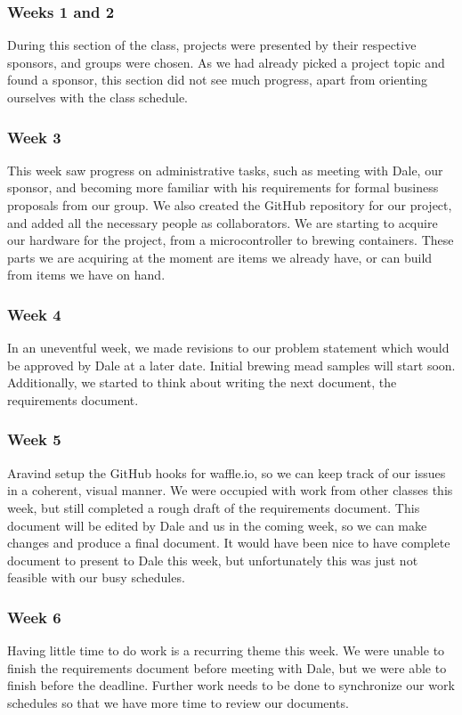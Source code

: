 \documentclass[draftclsnofoot,onecolumn,letterpaper,10pt]{IEEEtran}
\begin{document}
\subsubsection{Weeks 1 and 2}
During this section of the class, projects were presented by their respective sponsors, and groups were chosen.
As we had already picked a project topic and found a sponsor, this section did not see much progress, apart from orienting ourselves with the class schedule.

\subsubsection{Week 3} %
This week saw progress on administrative tasks, such as meeting with Dale, our sponsor, and becoming more familiar with his requirements for formal business proposals from our group.
We also created the GitHub repository for our project, and added all the necessary people as collaborators.
We are starting to acquire our hardware for the project, from a microcontroller to brewing containers. 
These parts we are acquiring at the moment are items we already have, or can build from items we have on hand.

\subsubsection{Week 4} %
In an uneventful week, we made revisions to our problem statement which would be approved by Dale at a later date.
Initial brewing mead samples will start soon.
Additionally, we started to think about writing the next document, the requirements document.

\subsubsection{Week 5} %
Aravind setup the GitHub hooks for waffle.io, so we can keep track of our issues in a coherent, visual manner.
We were occupied with work from other classes this week, but still completed a rough draft of the requirements document.
This document will be edited by Dale and us in the coming week, so we can make changes and produce a final document.
It would have been nice to have complete document to present to Dale this week, but unfortunately this was just not feasible with our busy schedules.

\subsubsection{Week 6}
Having little time to do work is a recurring theme this week.
We were unable to finish the requirements document before meeting with Dale, but we were able to finish before the deadline.
Further work needs to be done to synchronize our work schedules so that we have more time to review our documents.
\end{document}
